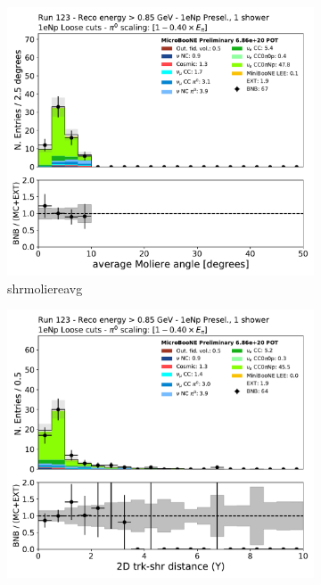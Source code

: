 \begin{figure}[H]
    \centering
    \begin{subfigure}{0.3\textwidth}
    \includegraphics[width=1.0\textwidth]{Sidebands/Figures/1eNp/HighEnergy/HiEext_NPOneShr_NPL_pi0e040/shrmoliereavg.pdf}
    \caption{shrmoliereavg}
    \end{subfigure}
    \begin{subfigure}{0.3\textwidth}
    \includegraphics[width=1.0\textwidth]{Sidebands/Figures/1eNp/HighEnergy/HiEext_NPOneShr_NPL_pi0e040/trkshrhitdist2.pdf}

\end{subfigure}
\end{figure}
